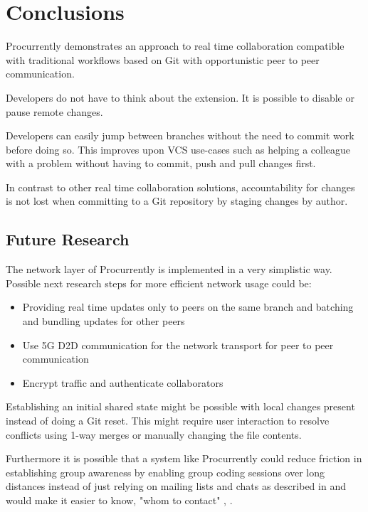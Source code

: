 \chapter{Conclusions}

Procurrently demonstrates an approach to real time collaboration compatible with traditional workflows based on Git with opportunistic peer to peer communication. 

Developers do not have to think about the extension. It is possible to disable or pause remote changes. 

Developers can easily jump between branches without the need to commit work before doing so. This improves upon VCS use-cases such as helping a colleague with a problem without having to commit, push and pull changes first. 

In contrast to other real time collaboration solutions, accountability for changes is not lost when committing to a Git repository by staging changes by author.

\section{Future Research}

The network layer of Procurrently is implemented in a very simplistic way.
Possible next research steps for more efficient network usage could be:

\begin{itemize}
    \item Providing real time updates only to peers on the same branch and batching and bundling updates for other peers
    \item Use 5G D2D communication for the network transport for peer to peer communication \cite{TehraniUysalYanikomeroglu:2014:Device-to-devicecommunicationin5G}
    \item Encrypt traffic and authenticate collaborators
\end{itemize}

Establishing an initial shared state might be possible with local changes present instead of doing a Git reset. This might require user interaction to resolve conflicts using 1-way merges or manually changing the file contents. \cite{7070484}

Furthermore it is possible that a system like Procurrently could reduce friction in establishing group awareness by enabling group coding sessions over long distances instead of just relying on mailing lists and chats as described in \cite{Gutwin:2004:GAD:1031607.1031621} and would make it easier to know, "whom to contact" \cite{795103}, \cite{Gutwin:2004:GAD:1031607.1031621}.

